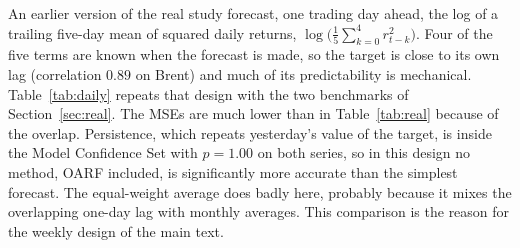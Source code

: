 \documentclass[12pt]{article}
\theoremstyle{plain}
\theoremstyle{remark}
\newcommand{\OARF}{\textsc{OARF}}
\begin{document}
An earlier version of the real study forecast, one trading day ahead, the log of a
trailing five-day mean of squared daily returns, $\log\big(\tfrac15\sum_{k=0}^{4}r_{t-k}^2\big)$.
Four of the five terms are known when the forecast is made, so the target is close to
its own lag (correlation $0.89$ on Brent) and much of its predictability is mechanical.
Table~\ref{tab:daily} repeats that design with the two benchmarks of
Section~\ref{sec:real}. The MSEs are much lower than in Table~\ref{tab:real} because of
the overlap. Persistence, which repeats yesterday's value of the target, is inside the
Model Confidence Set with $p=1.00$ on both series, so in this design no method,
\OARF{} included, is significantly more accurate than the simplest forecast. The
equal-weight average does badly here, probably because it mixes the overlapping one-day lag with
monthly averages. This comparison is the reason for the weekly design of the main text.
\end{document}
